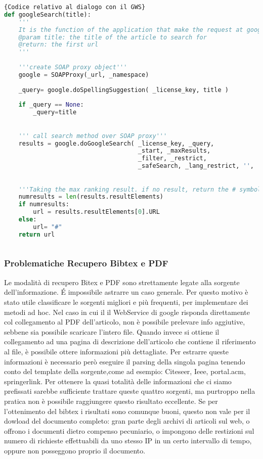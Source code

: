 \begin{lstlisting}[language=Python,frame=r,caption=Codice relativo al dialogo con il GWS ,breaklines=true,basicstyle=\scriptsize]{Codice relativo al dialogo con il GWS}
def googleSearch(title):
    '''
    It is the function of the application that make the request at google WS using SoapPY getting the first url of response.    
    @param title: the title of the article to search for
    @return: the first url
    '''
   
    '''create SOAP proxy object'''
    google = SOAPProxy(_url, _namespace)
    
    _query= google.doSpellingSuggestion( _license_key, title )
    
    if _query == None:
        _query=title

    
    ''' call search method over SOAP proxy'''
    results = google.doGoogleSearch( _license_key, _query, 
                                     _start, _maxResults, 
                                     _filter, _restrict,
                                     _safeSearch, _lang_restrict, '', '' )

    
    '''Taking the max ranking result. if no result, return the # symbol'''                                                       
    numresults = len(results.resultElements)
    if numresults:
        url = results.resultElements[0].URL
    else:
        url= "#"
    return url
    
\end{lstlisting}


\subsubsection{Problematiche Recupero Bibtex e PDF}
Le modalità di recupero Bitex e PDF sono strettamente legate alla sorgente dell'informazione. \'E impossibile astrarre un caso generale. Per questo motivo è stato utile classificare le sorgenti migliori e più frequenti, per implementare dei metodi ad hoc. Nel caso in cui il il WebService di google risponda direttamente col collegamento al PDF dell'articolo, non è possibile prelevare info aggiutive, sebbene sia possibile scaricare l'intero file.
Quando invece si ottiene il collegamento ad una pagina di descrizione dell'articolo che contiene il riferimento al file, è possibile ottere informazioni più dettagliate. Per estrarre queste informazioni è necessario però eseguire il parsing della singola pagina tenendo conto del template della sorgente,come ad esempio: Citeseer, Ieee, portal.acm, springerlink. 
Per ottenere la quasi totalità delle informazioni che ci siamo prefissati sarebbe sufficiente trattare queste quattro sorgenti, ma purtroppo nella pratica non è possibile raggiungere questo risultato eccellente. Se per l'ottenimento del bibtex i risultati sono comunque buoni, questo non vale per il dowload del documento completo: gran parte degli archivi di articoli sul web, o offrono i documenti dietro compenso pecuniario, o impongono delle restizioni sul numero di richieste effettuabili da uno stesso IP in un certo intervallo di tempo, oppure non posseggono proprio il documento.
